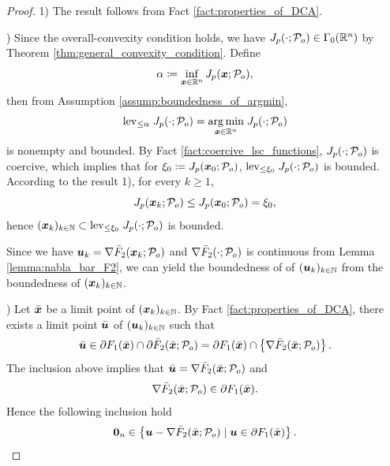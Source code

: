 \documentclass[lettersize,journal]{IEEEtran}
\theoremstyle{plain}%
\theoremstyle{definition}
\theoremstyle{remark}
\begin{document}
\begin{proof}
1) The result follows from Fact \ref{fact:properties_of_DCA}.

) Since the overall-convexity condition holds, we have $J_{p}(\cdot;\mathcal{P}_o)\in\Gamma_0(\mathbb{R}^n)$ by Theorem \ref{thm:general_convexity_condition}. Define
\begin{equation*}
\alpha\coloneqq \inf_{\bm{x}\in\mathbb{R}^n}J_{p}(\bm{x};\mathcal{P}_o),
\end{equation*}
then from Assumption \ref{assump:boundedness_of_argmin},
\[\mathrm{lev}_{\leq \alpha}\;J_{p}(\cdot;\mathcal{P}_o)=\underset{{\bm{x}\in\mathbb{R}^n}}{\mathrm{arg\,min}}\;J_{p}(\cdot;\mathcal{P}_o)\]
is nonempty and bounded. By Fact \ref{fact:coercive_lsc_functions}, $J_{p}(\cdot;\mathcal{P}_o)$ is coercive, which implies that for $\xi_0\coloneqq J_{p}(\bm{x}_0;\mathcal{P}_o)$, $\mathrm{lev}_{\leq \xi_0}\; J_{p}(\cdot;\mathcal{P}_o)$
is bounded. According to the result 1), for every $k\geq 1$,
\[J_{p}(\bm{x}_k;\mathcal{P}_o)\leq J_{p}(\bm{x}_0;\mathcal{P}_o)=\xi_0,\]
hence $(\bm{x}_k)_{k\in\mathbb{N}}\subset \mathrm{lev}_{\leq \xi_0}\; J_{p}(\cdot;\mathcal{P}_o)$ is bounded. 

Since we have $\bm{u}_k=\nabla \bar{F}_2(\bm{x}_k;\mathcal{P}_o)$ and $\nabla \bar{F}_2(\cdot;\mathcal{P}_o)$ is continuous from Lemma \ref{lemma:nabla_bar_F2}, we can yield the boundedness of of $(\bm{u}_k)_{k\in\mathbb{N}}$ from the boundedness of $(\bm{x}_k)_{k\in\mathbb{N}}$.

) Let $\bar{\bm{x}}$ be a limit point of $(\bm{x}_k)_{k\in\mathbb{N}}$. By Fact \ref{fact:properties_of_DCA}, there exists a limit point $\bar{\bm{u}}$ of $(\bm{u}_k)_{k\in\mathbb{N}}$ such that
\begin{equation*}
\bar{\bm{u}}\in\partial F_1(\bar{\bm{x}})\cap \partial \bar{F}_2(\bar{\bm{x}};\mathcal{P}_o)=\partial F_1(\bar{\bm{x}})\cap \left\{ \nabla \bar{F}_2(\bar{\bm{x}};\mathcal{P}_o) \right\}.
\end{equation*}
The inclusion above implies that $\bar{\bm{u}}=\nabla \bar{F}_2(\bar{\bm{x}};\mathcal{P}_o)$ and
\begin{equation*}
\nabla \bar{F}_2(\bar{\bm{x}};\mathcal{P}_o)\in\partial F_1(\bar{\bm{x}}).
\end{equation*}
Hence the following inclusion hold
\begin{equation}\label{eq:zero_inclusion}
\mathbf{0}_n\in \left\{ \bm{u}-\nabla \bar{F}_2(\bar{\bm{x}};\mathcal{P}_o) \mid \bm{u}\in\partial F_1(\bar{\bm{x}}) \right\}.
\end{equation}


\end{proof}
\end{document}
